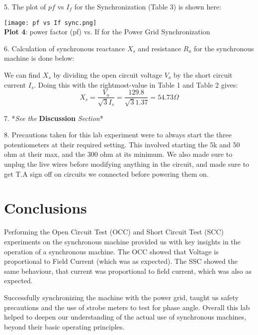 \documentclass[]{report}
\begin{document}
5. The plot of $pf$ vs $I_f$ for the Synchronization (Table 3) is shown here:

\begin{center}
	\centering
	\texttt{[image: pf vs If sync.png]} \\
	\textbf{Plot 4}: power factor (pf) vs. If for the Power Grid Synchronization
\end{center}

6. Calculation of synchronous reactance $X_s$ and resistance $R_a$ for the synchronous machine is done below:

We can find $X_s$ by dividing the open circuit voltage $V_o$ by the short circuit current $I_s$. Doing this with the rightmost-value in Table 1 and Table 2 gives:
	\[ X_s = \frac{V_o}{\sqrt{3}I_s} = \frac{129.8}{\sqrt{3}1.37} = 54.73 \Omega	\]

7. *\textit{See the} \textbf{Discussion} \textit{Section}*

8. Precautions taken for this lab experiment were to always start the three potentiometers at their required setting. This involved starting the 5k and 50 ohm at their max, and the 300 ohm at its minimum. We also made sure to unplug the live wires before modifying anything in the circuit, and made sure to get T.A sign off on circuits we connected before powering them on.

\section*{Conclusions}

Performing the Open Circuit Test (OCC) and Short Circuit Test (SCC) experiments on the synchronous machine provided us with key insights in the operation of a synchronous machine. The OCC showed that Voltage is proportional to Field Current (which was as expected). The SSC showed the same behaviour, that current was proportional to field current, which was also as expected.

Successfully synchronizing the machine with the power grid, taught us safety precautions and the use of strobe meters to test for phase angle. Overall this lab helped to deepen our understanding of the actual use of synchronous machines, beyond their basic operating principles.
\end{document}
